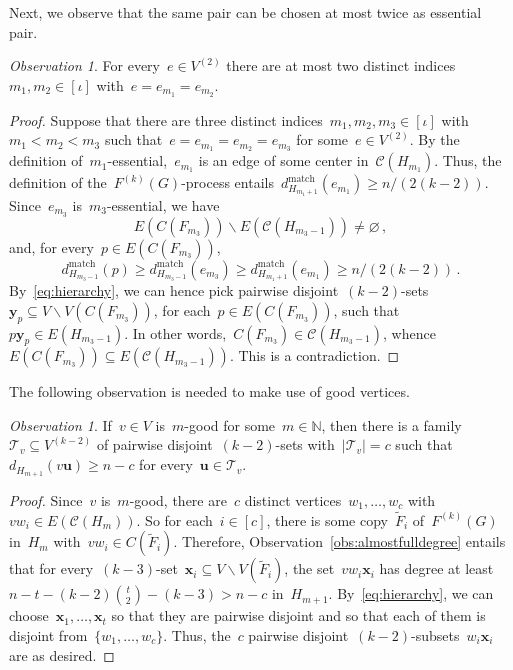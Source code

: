 \documentclass[oneside, 12pt]{amsart}
\numberwithin{equation}{section}
\numberwithin{figure}{section}
\let\emptyset=\varnothing
\let\setminus=\smallsetminus
\newcommand{\cC}{\mathcal{C}}
\newcommand{\cT}{\mathcal{T}}
\theoremstyle{plain}
\theoremstyle{note}
\theoremstyle{remark}
\newtheorem{observation}[theorem]{Observation}
\begin{document}
	Next, we observe that the same pair can be chosen at most twice as essential pair.
    \begin{observation}\label{obs:atmosttwiceessential}
		For every~$e\in V^{(2)}$ there are at most two distinct indices~$m_1,m_2\in[\iota]$ with~$e=e_{m_1}=e_{m_2}$.    
	\end{observation}
	\begin{proof}
		Suppose that there are three distinct indices~$m_1,m_2,m_3\in[\iota]$ with~$m_1<m_2<m_3$ such that~$e=e_{m_1}=e_{m_2}=e_{m_3}$ for some~$e\in V^{(2)}$.
		By the definition of~$m_1$-essential,~$e_{m_1}$ is an edge of some center in~$\cC(H_{m_1})$.
		Thus, the definition of the~$F^{(k)}(G)$-process entails~$d^{\text{match}}_{H_{m_1+1}}(e_{m_1})\geq n/(2(k-2))$.
		Since~$e_{m_3}$ is~$m_3$-essential, we have $$E(C(F_{m_3}))\setminus E(\cC(H_{m_3-1}))\neq \emptyset\,,$$ and, for every~$p\in E(C(F_{m_3}))$, $$d^{\text{match}}_{H_{m_3-1}}(p)\geq d^{\text{match}}_{H_{m_3-1}}(e_{m_3}) \geq d^{\text{match}}_{H_{m_1+1}}(e_{m_1})\geq n/(2(k-2))\,.$$
		By~\eqref{eq:hierarchy}, we can hence pick pairwise disjoint~$(k-2)$-sets~$\mathbf{y}_p\subseteq V\setminus V(C(F_{m_3}))$, for each~$p\in E(C(F_{m_3}))$, such that~$p\mathbf{y}_p\in E(H_{m_3-1})$.
		In other words,~$C(F_{m_3})\in\cC(H_{m_3-1})$, whence~$E(C(F_{m_3}))\subseteq E(\cC(H_{m_3-1}))$.
		This is a contradiction.
	\end{proof}

    The following observation is needed to make use of good vertices.

    \begin{observation}\label{obs:manycenteredges->good}
        If~$v\in V$ is~$m$-good for some~$m\in\mathds{N}$, then there is a family~$\cT_v\subseteq V^{(k-2)}$ of pairwise disjoint~$(k-2)$-sets with~$\vert\cT_v\vert=c$ such that~$d_{H_{m+1}}(v\mathbf{u})\geq n-c$ for every~$\mathbf{u}\in\cT_v$.
    \end{observation}
    
    \begin{proof}
        Since~$v$ is~$m$-good, there are~$c$ distinct vertices~$w_1, \ldots, w_c$ with~$vw_i\in E(\cC(H_m))$.
        So for each~$i\in[c]$, there is some copy~$\widetilde{F}_i$ of~$F^{(k)}(G)$ in~$H_m$ with~$vw_i\in C(\widetilde{F}_i)$.
		Therefore, Observation~\ref{obs:almostfulldegree} entails that for every~$(k-3)$-set~$\mathbf{x}_i \subseteq V \setminus V(\widetilde{F}_i)$, the set~$vw_i\mathbf{x}_i$ has degree at least~$n-t-(k-2)\binom{t}{2}-(k-3)>n-c$ in~$H_{m+1}$.
		By~\eqref{eq:hierarchy}, we can choose~$\mathbf{x}_1,\ldots,\mathbf{x}_t$ so that they are pairwise disjoint and so that each of them is disjoint from~$\{w_1,\dots,w_c\}$.
		Thus, the~$c$ pairwise disjoint~$(k-2)$-subsets~$w_i\mathbf{x}_i$ are as desired.
    \end{proof}
\end{document}
